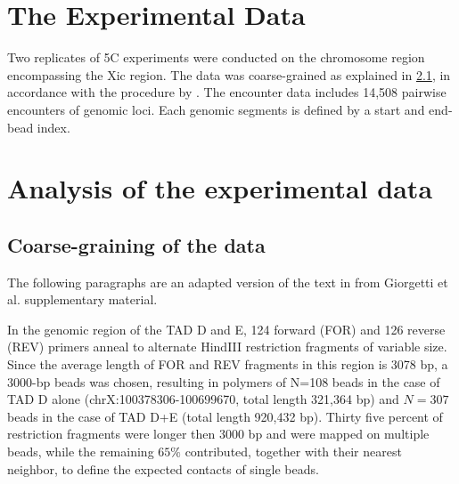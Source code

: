 \documentclass[12pt]{book}
\begin{document}
\section{The Experimental Data}\label{section_theExperimentalData}
Two replicates of 5C experiments were conducted on the chromosome region encompassing the Xic region. The data was coarse-grained as explained in \ref{subsection_coarseGrainingOfEncounterData}, in accordance with the procedure by \cite{giorgetti2014predictive}\cite{nora2012spatial}.
The encounter data includes 14,508 pairwise encounters of genomic loci. Each genomic segments is defined by a start and end-bead index.

\section{Analysis of the experimental data}\label{section_AnalysisOfTheExperimentalData}

\subsection{Coarse-graining of the data}\label{subsection_coarseGrainingOfEncounterData}
The following paragraphs are an adapted version of the text in from Giorgetti et al. \cite{giorgetti2014predictive} supplementary material.

In the genomic region of the TAD D and E, 124 forward (FOR) and 126 reverse (REV) primers anneal to alternate HindIII restriction fragments of variable size. 
Since the average length of FOR and REV fragments in this region is 3078 bp, a 3000-bp beads was chosen, resulting in polymers of N=108 beads in the case of TAD D alone (chrX:100378306-100699670, total length 321,364 bp) and $N=307$ beads in the case of TAD D+E (total length 920,432 bp). Thirty five percent of restriction fragments were longer then 3000 bp and were mapped on multiple beads, while the remaining $65\%$ contributed, together with their nearest neighbor, to define the expected contacts of single beads.
\end{document}
